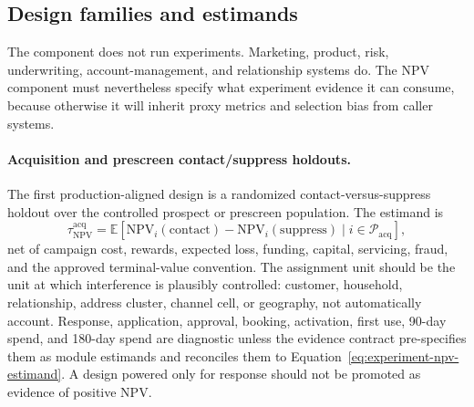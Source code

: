 \documentclass[11pt]{article}
\newcommand{\E}{\mathbb{E}}
\newcommand{\NPV}{\mathrm{NPV}}
\newcommand{\1}{\mathbf{1}}
\begin{document}
\subsection{Design families and estimands}

The component does not run experiments. Marketing, product, risk,
underwriting, account-management, and relationship systems do. The NPV
component must nevertheless specify what experiment evidence it can consume,
because otherwise it will inherit proxy metrics and selection bias from caller
systems.

\paragraph{Acquisition and prescreen contact/suppress holdouts.}
The first production-aligned design is a randomized contact-versus-suppress
holdout over the controlled prospect or prescreen population. The estimand is
\begin{equation}
  \tau^{\mathrm{acq}}_{\NPV}
  =
  \E[\NPV_i(\mathrm{contact})-\NPV_i(\mathrm{suppress})
  \mid i\in\mathcal{P}_{\mathrm{acq}}],
  \label{eq:acq-holdout-estimand}
\end{equation}
net of campaign cost, rewards, expected loss, funding, capital, servicing,
fraud, and the approved terminal-value convention. The assignment unit should
be the unit at which interference is plausibly controlled: customer,
household, relationship, address cluster, channel cell, or geography, not
automatically account. Response, application, approval, booking, activation,
first use, 90-day spend, and 180-day spend are diagnostic unless the evidence
contract pre-specifies them as module estimands and reconciles them to
Equation~\eqref{eq:experiment-npv-estimand}. A design powered only for
response should not be promoted as evidence of positive NPV.
\end{document}

